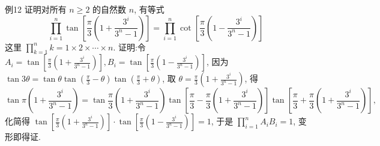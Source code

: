 例12 证明对所有 $n \geqslant 2$ 的自然数 $n$, 有等式
$$
\prod_{i=1}^n \tan \left[\frac{\pi}{3}\left(1+\frac{3^i}{3^n-1}\right)\right]=\prod_{i=1}^n \cot \left[\frac{\pi}{3}\left(1-\frac{3^i}{3^n-1}\right)\right]
$$
这里 $\prod_{k=1}^n k=1 \times 2 \times \cdots \times n$.
证明:令 $A_i=\tan \left[\frac{\pi}{3}\left(1+\frac{3^i}{3^n-1}\right)\right], B_i=\tan \left[\frac{\pi}{3}\left(1-\frac{3^i}{3^n-1}\right)\right]$, 因为 $\tan 3 \theta=\tan \theta \tan \left(\frac{\pi}{3}-\theta\right) \tan \left(\frac{\pi}{3}+\theta\right)$, 取 $\theta=\frac{\pi}{3}\left(1+\frac{3^i}{3^n-1}\right)$, 得
$$
\tan \pi\left(1+\frac{3^i}{3^n-1}\right)=\tan \frac{\pi}{3}\left(1+\frac{3^i}{3^n-1}\right) \tan \left[\frac{\pi}{3}-\frac{\pi}{3}\left(1+\frac{3^i}{3^n-1}\right)\right] \tan \left[\frac{\pi}{3}+\frac{\pi}{3}\left(1+\frac{3^i}{3^n-1}\right)\right],
$$
化简得 $\tan \left[\frac{\pi}{3}\left(1+\frac{3^i}{3^n-1}\right)\right] \cdot \tan \left[\frac{\pi}{3}\left(1-\frac{3^i}{3^n-1}\right)\right]=1$, 于是 $\prod_{i=1}^n A_i B_i=1$, 变形即得证.



